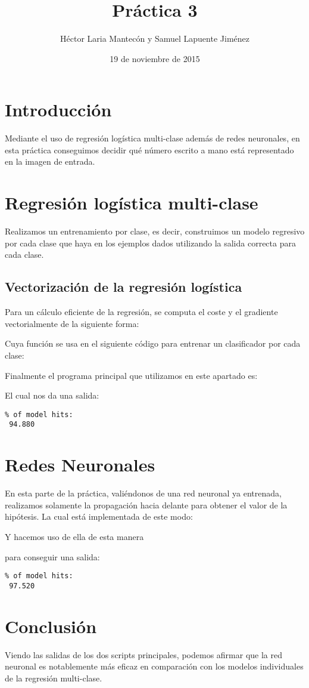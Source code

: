 \documentclass{article}
\title{Práctica 3}
\author{Héctor Laria Mantecón y Samuel Lapuente Jiménez}
\date{19 de noviembre de 2015}
\begin{document}
\maketitle

\section{Introducción}
Mediante el uso de regresión logística multi-clase además de redes neuronales, en esta práctica conseguimos decidir qué número escrito a mano está representado en la imagen de entrada.

\section{Regresión logística multi-clase}
Realizamos un entrenamiento por clase, es decir, construimos un modelo regresivo por cada clase que haya en los ejemplos dados utilizando la salida correcta para cada clase.

\subsection{Vectorización de la regresión logística}
Para un cálculo eficiente de la regresión, se computa el coste y el gradiente vectorialmente de la siguiente forma:


\pagebreak
Cuya función se usa en el siguiente código para entrenar un clasificador por cada clase:


Finalmente el programa principal que utilizamos en este apartado es:

El cual nos da una salida:
\begin{lstlisting}
% of model hits:
 94.880
\end{lstlisting}


\section{Redes Neuronales}
En esta parte de la práctica, valiéndonos de una red neuronal ya entrenada, realizamos solamente la propagación hacia delante para obtener el valor de la hipótesis.
La cual está implementada de este modo:


Y hacemos uso de ella de esta manera

para conseguir una salida:
\begin{lstlisting}
% of model hits:
 97.520
\end{lstlisting}

\section{Conclusión}
Viendo las salidas de los dos scripts principales, podemos afirmar que la red neuronal es notablemente más eficaz en comparación con los modelos individuales de la regresión multi-clase.
\end{document}
